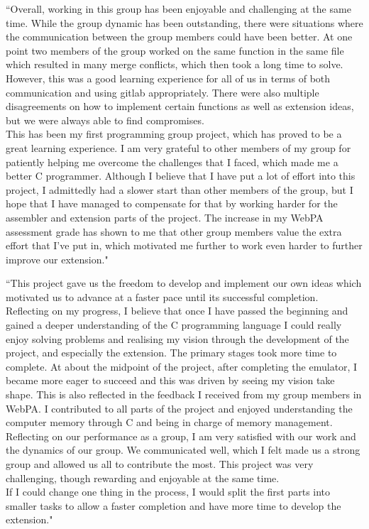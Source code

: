 \documentclass[11pt]{article}
\newenvironment{myquote}%
  {\list{}{\leftmargin=0.0in\rightmargin=0.0in}\item[]}%
  {\endlist}
\begin{document}
\begin{myquote}
``Overall, working in this group has been enjoyable and challenging at the same time. While the group dynamic has been outstanding, there were situations where the communication between the group members could have been better. At one point two members of the group worked on the same function in the same file which resulted in many merge conflicts, which then took a long time to solve. However, this was a good learning experience for all of us in terms of both communication and using gitlab appropriately. There were also multiple disagreements on how to implement certain functions as well as extension ideas, but we were always able to find compromises.
\\This has been my first programming group project, which has proved to be a great learning experience.  I am very grateful to other members of my group for patiently helping me overcome the challenges that I faced, which made me a better C programmer. Although I believe that I have put a lot of effort into this project, I admittedly had a slower start than other members of the group, but I hope that I have managed to compensate for that by working harder for the assembler and extension parts of the project. The increase in my WebPA assessment grade has shown to me that other group members value the extra effort that I've put in, which motivated me further to work even harder to further improve our extension."
\end{myquote}


\begin{myquote}
``This project gave us the freedom to develop and implement our own ideas which motivated us to advance at a faster pace until its successful completion.
\\
Reflecting on my progress, I believe that once I have passed the beginning and gained a deeper understanding of the C programming language I could really enjoy solving problems and realising my vision through the development of the project, and especially the extension. The primary stages took more time to complete. At about the midpoint of the project, after completing the emulator, I became more eager to succeed and this was driven by seeing my vision take shape. This is also reflected in the feedback I received from my group members in WebPA. I contributed to all parts of the project and enjoyed understanding the computer memory through C and being in charge of memory management.
\\
Reflecting on our performance as a group, I am very satisfied with our work and the dynamics of our group. We communicated well, which I felt made us a strong group and allowed us all to contribute the most. This project was very challenging, though rewarding and enjoyable at the same time.
\\
If I could change one thing in the process, I would split the first parts into smaller tasks to allow a faster completion and have more time to develop the extension."

\end{myquote}
\end{document}
